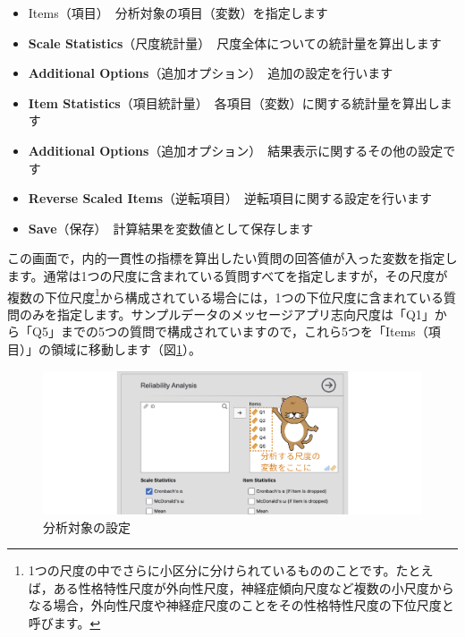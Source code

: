 \documentclass[
  12pt,
  a5jpaper,
  lualatex, ja=standard]{bxjsbook}
\providecommand{\tightlist}{%
  \setlength{\itemsep}{0pt}\setlength{\parskip}{0pt}}
\newenvironment{jmvsettings}{%
	\begin{center}%
	\begin{tcolorbox}[%
		title=設定項目,
		colframe=gmoji,
		colbacktitle=gmoji,
		colback=gmoji!2!white,
		breakable,
		width=.9\textwidth,
		]\small\addtolength{\leftmargini}{-3\labelsep}%
	}%
	{\end{tcolorbox}\end{center}}
\begin{document}
\begin{jmvsettings}

\begin{itemize}
\tightlist
\item
  Items（項目）　分析対象の項目（変数）を指定します
\item
  \textbf{Scale Statistics}（尺度統計量）　尺度全体についての統計量を算出します
\item
  \textbf{Additional Options}（追加オプション）　追加の設定を行います
\item
  \textbf{Item Statistics}（項目統計量）　各項目（変数）に関する統計量を算出します
\item
  \textbf{Additional Options}（追加オプション）　結果表示に関するその他の設定です
\item
  \textbf{Reverse Scaled Items}（逆転項目）　逆転項目に関する設定を行います
\item
  \textbf{Save}（保存）　計算結果を変数値として保存します
\end{itemize}

\end{jmvsettings}

この画面で，内的一貫性の指標を算出したい質問の回答値が入った変数を指定します。通常は1つの尺度に含まれている質問すべてを指定しますが，その尺度が複数の下位尺度\footnote{1つの尺度の中でさらに小区分に分けられているもののことです。たとえば，ある性格特性尺度が外向性尺度，神経症傾向尺度など複数の小尺度からなる場合，外向性尺度や神経症尺度のことをその性格特性尺度の下位尺度と呼びます。}から構成されている場合には，1つの下位尺度に含まれている質問のみを指定します。サンプルデータのメッセージアプリ志向尺度は「Q1」から「Q5」までの5つの質問で構成されていますので，これら5つを「Items（項目）」の領域に移動します（図\ref{fig:factor-reliability-set-var}）。

\begin{figure}[!ht]

{\centering \includegraphics[width=1\linewidth]{images/factor/reliability-set-var} 

}

\caption{分析対象の設定}\label{fig:factor-reliability-set-var}
\end{figure}
\end{document}
